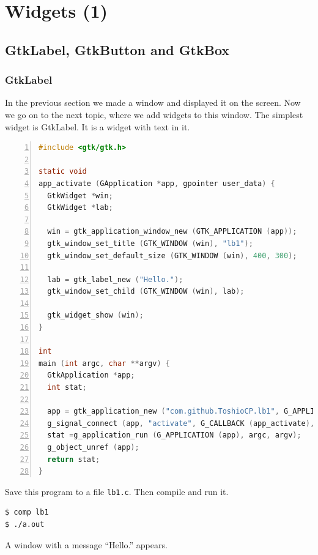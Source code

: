 \hypertarget{widgets-1}{%
\section{Widgets (1)}\label{widgets-1}}

\hypertarget{gtklabel-gtkbutton-and-gtkbox}{%
\subsection{GtkLabel, GtkButton and
GtkBox}\label{gtklabel-gtkbutton-and-gtkbox}}

\hypertarget{gtklabel}{%
\subsubsection{GtkLabel}\label{gtklabel}}

In the previous section we made a window and displayed it on the screen.
Now we go on to the next topic, where we add widgets to this window. The
simplest widget is GtkLabel. It is a widget with text in it.

\begin{lstlisting}[language=C, numbers=left]
#include <gtk/gtk.h>

static void
app_activate (GApplication *app, gpointer user_data) {
  GtkWidget *win;
  GtkWidget *lab;

  win = gtk_application_window_new (GTK_APPLICATION (app));
  gtk_window_set_title (GTK_WINDOW (win), "lb1");
  gtk_window_set_default_size (GTK_WINDOW (win), 400, 300);

  lab = gtk_label_new ("Hello.");
  gtk_window_set_child (GTK_WINDOW (win), lab);

  gtk_widget_show (win);
}

int
main (int argc, char **argv) {
  GtkApplication *app;
  int stat;

  app = gtk_application_new ("com.github.ToshioCP.lb1", G_APPLICATION_FLAGS_NONE);
  g_signal_connect (app, "activate", G_CALLBACK (app_activate), NULL);
  stat =g_application_run (G_APPLICATION (app), argc, argv);
  g_object_unref (app);
  return stat;
}
\end{lstlisting}

Save this program to a file \passthrough{\lstinline!lb1.c!}. Then
compile and run it.

\begin{lstlisting}
$ comp lb1
$ ./a.out
\end{lstlisting}

A window with a message ``Hello.'' appears.

